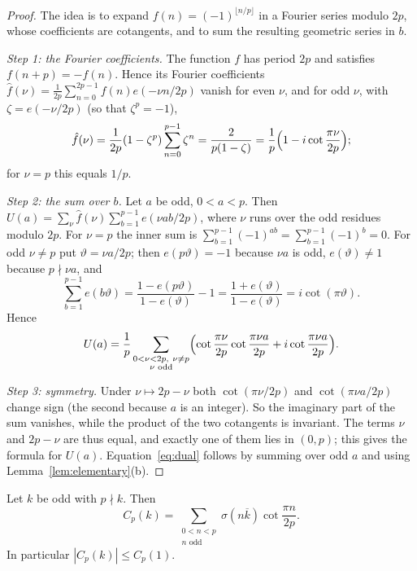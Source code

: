 \begin{proof}
The idea is to expand $f(n)=(-1)^{\lfloor n/p\rfloor}$ in a Fourier series modulo $2p$, whose coefficients are cotangents, and to sum the resulting geometric series in $b$.

\emph{Step 1: the Fourier coefficients.} The function $f$ has period $2p$ and satisfies $f(n+p)=-f(n)$. Hence its Fourier coefficients $\hat f(\nu)=\frac1{2p}\sum_{n=0}^{2p-1}f(n)e(-\nu n/2p)$ vanish for even $\nu$, and for odd $\nu$, with $\zeta=e(-\nu/2p)$ (so that $\zeta^p=-1$),
\begin{equation}\label{eq:fourier-coeff}
\hat f(\nu)=\frac1{2p}(1-\zeta^p)\sum_{n=0}^{p-1}\zeta^n=\frac2{p(1-\zeta)}=\frac1p\Bigl(1-i\cot\frac{\pi\nu}{2p}\Bigr);
\end{equation}
for $\nu=p$ this equals $1/p$.

\emph{Step 2: the sum over $b$.} Let $a$ be odd, $0<a<p$. Then $U(a)=\sum_\nu\hat f(\nu)\sum_{b=1}^{p-1}e(\nu ab/2p)$, where $\nu$ runs over the odd residues modulo $2p$. For $\nu=p$ the inner sum is $\sum_{b=1}^{p-1}(-1)^{ab}=\sum_{b=1}^{p-1}(-1)^b=0$. For odd $\nu\ne p$ put $\vartheta=\nu a/2p$; then $e(p\vartheta)=-1$ because $\nu a$ is odd, $e(\vartheta)\ne1$ because $p\nmid\nu a$, and
\[
\sum_{b=1}^{p-1}e(b\vartheta)=\frac{1-e(p\vartheta)}{1-e(\vartheta)}-1=\frac{1+e(\vartheta)}{1-e(\vartheta)}=i\cot(\pi\vartheta).
\]
Hence
\[
U(a)=\frac1p\sum_{\substack{0<\nu<2p,\ \nu\ne p\\ \nu\text{ odd}}}\Bigl(\cot\frac{\pi\nu}{2p}\cot\frac{\pi\nu a}{2p}+i\cot\frac{\pi\nu a}{2p}\Bigr).
\]

\emph{Step 3: symmetry.} Under $\nu\mapsto2p-\nu$ both $\cot(\pi\nu/2p)$ and $\cot(\pi\nu a/2p)$ change sign (the second because $a$ is an integer). So the imaginary part of the sum vanishes, while the product of the two cotangents is invariant. The terms $\nu$ and $2p-\nu$ are thus equal, and exactly one of them lies in $(0,p)$; this gives the formula for $U(a)$. Equation~\eqref{eq:dual} follows by summing over odd $a$ and using Lemma~\ref{lem:elementary}(b).
\end{proof}

\begin{lemma}\label{lem:sign-form}
Let $k$ be odd with $p\nmid k$. Then
\begin{equation}\label{eq:sign-form}
C_p(k)=\sum_{\substack{0<n<p\\ n\text{ odd}}}\sigma(n\overline k)\cot\frac{\pi n}{2p}.
\end{equation}
In particular $|C_p(k)|\le C_p(1)$.
\end{lemma}

